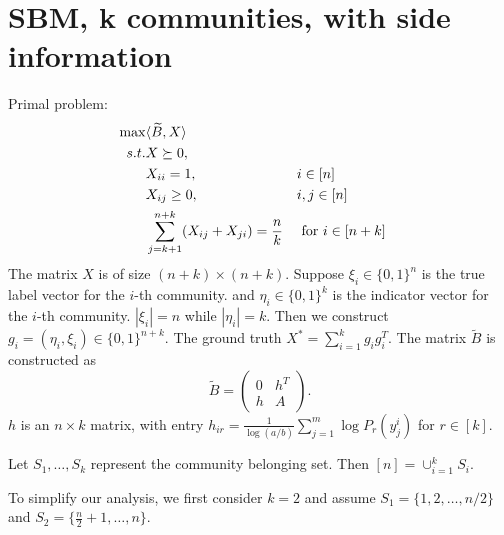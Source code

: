 \documentclass{ctexart}
\begin{document}
\section{SBM, k communities, with side information}
Primal problem:
\begin{align}
\max & \langle \widetilde{B},X \rangle \notag \\
s.t. & X \succeq 0, \notag\\
&X_{ii} = 1,  && i \in [n] \notag\\
&X_{ij} \geq 0, && i,j \in [n] \notag\\
&\sum_{j=k+1}^{n+k} (X_{ij} + X_{ji})  = \frac{n}{k}&& \textrm{ for } i \in [n+k]\label{eq:AZ_ext}
\end{align}
The matrix $X$ is of size $(n+k) \times (n+k)$.
Suppose $\xi_i \in \{0,1\}^n $ is the true label vector for the $i$-th community.
and $\eta_i \in \{0,1\}^k$ is the indicator vector for the $i$-th community.
$|\xi_i|=n$ while $|\eta_i|=k$. Then we construct $g_i=(\eta_i, \xi_i)
\in \{0,1\}^{n+k}$.
The ground truth $X^*=\sum_{i=1}^k g_i g_i^T$.
The matrix $\widetilde{B}$ is constructed as
\begin{equation}\label{eq:B_lambda_def}
	\widetilde{B} = \begin{pmatrix} 0 & h^T  \\ h  & A \end{pmatrix}.
\end{equation}
$h$ is an $n\times k$ matrix, with entry $h_{ir} = \frac{1}{\log(a/b)}
\sum_{j=1}^m \log P_r(y^i_{j})$ for $r\in[k]$.


Let $S_1, \dots, S_k$ represent the community belonging set.
Then $[n]=\cup_{i=1}^k S_i$.

To simplify our analysis, we first consider $k=2$ and assume $S_1=\{1,2,\dots, n/2\}$ 
and $S_2=\{\frac{n}{2}+1, \dots, n\}$.
\end{document}
